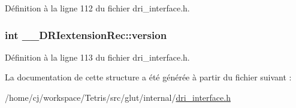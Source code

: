 Définition à la ligne 112 du fichier dri\-\_\-interface.\-h.

\hypertarget{struct_____d_r_iextension_rec_a6fa021bb0b66dbc662a4397a21ffa198}{
\subsubsection[{version}]{\setlength{\rightskip}{0pt plus 5cm}int \-\_\-\-\_\-\-D\-R\-Iextension\-Rec\-::version}}\label{struct_____d_r_iextension_rec_a6fa021bb0b66dbc662a4397a21ffa198}


Définition à la ligne 113 du fichier dri\-\_\-interface.\-h.



La documentation de cette structure a été générée à partir du fichier suivant \-:\begin{DoxyCompactItemize}
\item 
/home/cj/workspace/\-Tetris/src/glut/internal/\hyperlink{dri__interface_8h}{dri\-\_\-interface.\-h}\end{DoxyCompactItemize}
